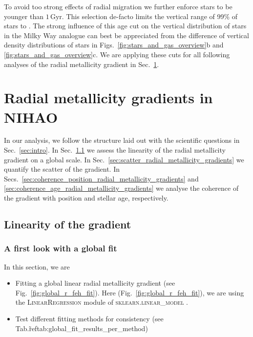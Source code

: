 \documentclass[fleqn,usenatbib]{mnras}
\begin{document}
To avoid too strong effects of radial migration \citep{Binney2008, Frankel2018} we further enforce stars to be younger than $1\,\mathrm{Gyr}$. This selection de-facto limits the vertical range of 99\% of stars to . The strong influence of this age cut on the vertical distribution of stars in the Milky Way analogue can best be appreciated from the difference of vertical density distributions of stars in Figs.~\ref{fig:stars_and_gas_overview}b and \ref{fig:stars_and_gas_overview}c. We are applying these cuts for all following analyses of the radial metallicity gradient in Sec.~\ref{sec:radial_metallicity_gradients}.


\section{Radial metallicity gradients in NIHAO}
\label{sec:radial_metallicity_gradients}

In our analysis, we follow the structure laid out with the scientific questions in Sec.~\ref{sec:intro}. In Sec.~\ref{sec:linear_radial_metallicity_gradients} we assess the linearity of the radial metallicity gradient on a global scale. In Sec.~\ref{sec:scatter_radial_metallicity_gradients} we quantify the scatter of the gradient. In Secs.~\ref{sec:coherence_position_radial_metallicity_gradients} and \ref{sec:coherence_age_radial_metallicity_gradients} we analyse the coherence of the gradient with position and stellar age, respectively.

\subsection{Linearity of the gradient}
\label{sec:linear_radial_metallicity_gradients}

\subsubsection{A first look with a global fit}

In this section, we are
\begin{itemize}
    \item Fitting a global linear radial metallicity gradient (see Fig.~\ref{fig:global_r_feh_fit}). Here (Fig.~\ref{fig:global_r_feh_fit}), we are using the \textsc{LinearRegression} module of \textsc{sklearn.linear\_model} \citep{scikit-learn}.
    \item Test different fitting methods for consistency (see Tab.\~ref{tab:global_fit_results_per_method})
\end{itemize}
\end{document}
